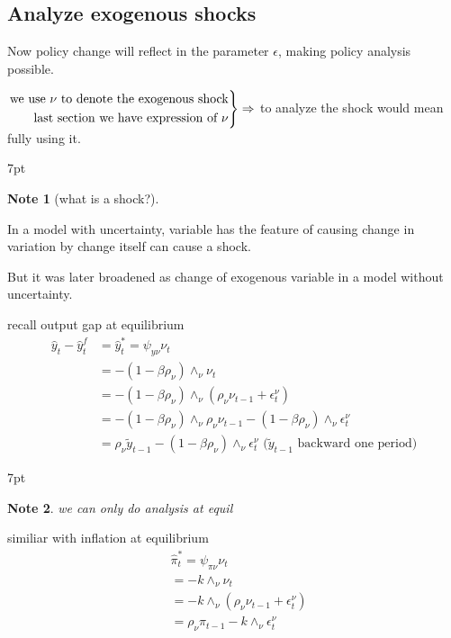 \documentclass{article}
\newenvironment{rcases}
  {\left.\begin{aligned}}
  {\end{aligned}\right\rbrace}
\newenvironment{blueblock}{
\def\FrameCommand{
  \hspace{1pt}
    {\color{DarkBlue}
    \vrule width 2pt}
    {\color{blueshade}
    \vrule width 4pt}
  \colorbox{blueshade}
}
\MakeFramed{
  \advance
  \hsize-
  \width
  \FrameRestore}
\noindent\hspace{-4.55pt}%
\begin{adjustwidth}{}{7pt}
\vspace{2pt}\vspace{2pt}
}
{\vspace{2pt}\end{adjustwidth}\endMakeFramed}
\newtheorem{note}{Note}
\begin{document}
\subsection{Analyze exogenous shocks}  

Now policy change will reflect in the parameter $\epsilon$, making policy analysis possible.


$\begin{rcases}
  \text{we use }\nu \text{ to denote the exogenous shock}
  \\
  \text{last section we have expression of }\nu
\end{rcases} \Rightarrow$ to analyze the shock would mean fully using it.

\begin{blueblock}
\begin{note}[what is a shock?]
\end{note}

In a model with uncertainty, variable has the feature of causing change in variation by change itself can cause a shock.

But it was later broadened as change of exogenous variable in a model without uncertainty.

\end{blueblock}

recall output gap at equilibrium
\begin{align}
\hat y_t-\hat y_t^f&=\hat y_t^*=\psi_{y \nu} \nu_t
\\&=-(1-\beta \rho_\nu)\wedge_\nu \nu_t
\\&=-(1-\beta \rho_\nu)\wedge_\nu (\rho_\nu \nu_{t-1}+\epsilon^\nu_t)
\\&=-(1-\beta \rho_\nu)\wedge_\nu \rho_\nu \nu_{t-1}-(1-\beta \rho_\nu)\wedge_\nu \epsilon^\nu_t
\\&= \rho_\nu \tilde y_{t-1}-(1-\beta \rho_\nu)\wedge_\nu \epsilon_t^\nu \text{ ($\tilde y_{t-1}$ backward one period)}
\end{align}

\begin{blueblock}
\begin{note}
we can only do analysis at equil
\end{note}
\end{blueblock}

similiar with inflation at equilibrium
\begin{align}
&\hat \pi_t^*=\psi_{\pi \nu} \nu_t
\\&=-k \wedge_\nu \nu_t
\\&=-k \wedge_\nu(\rho_\nu \nu_{t-1}+\epsilon_t^\nu)
\\&=\rho_\nu \pi_{t-1}-k\wedge_\nu \epsilon_t^\nu
\end{align}
\end{document}
